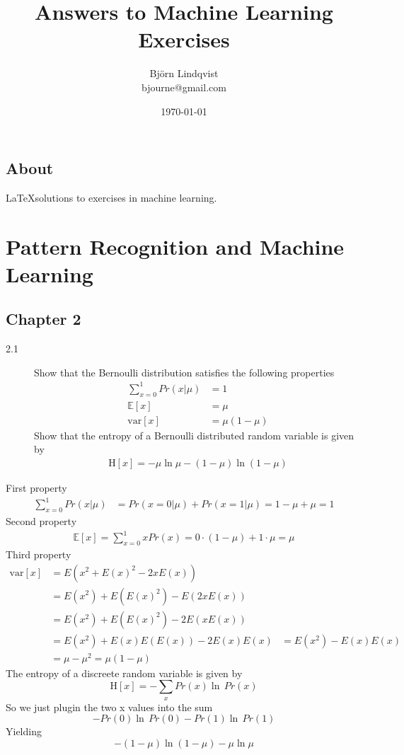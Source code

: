 \documentclass[10pt,a4paper]{article}
\title{Answers to Machine Learning Exercises}
\author{Björn Lindqvist\\bjourne@gmail.com}
\date{\today}
\newenvironment{prob}[1]%
   {%
    \begin{description}\item[#1]}%
   {\end{description}}
\begin{document}
\begin{titlingpage}
  \maketitle
  \thispagestyle{empty}
  \section*{About}
  \LaTeX solutions to exercises in machine learning.
  \tableofcontents
\end{titlingpage}

\section{Pattern Recognition and Machine Learning}

\subsection{Chapter 2}
\begin{prob}{2.1}
  Show that the Bernoulli distribution satisfies the following
  properties
  \begin{align}
    \sum_{x = 0}^1Pr(x|\mu) &= 1\\
    \mathbb{E}[x] &= \mu\\
    \mathrm{var}[x] &= \mu(1 - \mu)
  \end{align}
  Show that the entropy of a Bernoulli distributed random variable is
  given by
  \begin{align}
    \mathrm{H}[x] = -\mu\ln\mu - (1 - \mu)\ln(1 - \mu)
  \end{align}
\end{prob}
First property
\begin{align}
  \sum_{x = 0}^1Pr(x|\mu) &= Pr(x = 0|\mu) + Pr(x = 1|\mu)
  = 1 - \mu + \mu = 1
\end{align}
Second property
\begin{align}
  \mathbb{E}[x] = \sum_{x = 0}^1xPr(x) = 0\cdot(1 - \mu) + 1\cdot\mu = \mu
\end{align}
Third property
\begin{align}
  \mathrm{var}[x] &= E(x^2 + E(x)^2 - 2xE(x))\\
  &= E(x^2) + E(E(x)^2) - E(2xE(x))\\
  &= E(x^2) + E(E(x)^2) - 2E(xE(x))\\
  &= E(x^2) + E(x)E(E(x)) - 2E(x)E(x)
  &= E(x^2) - E(x)E(x)\\
  &= \mu - \mu^2 = \mu(1 - \mu)
\end{align}
The entropy of a discreete random variable is given by
\begin{equation}
  \mathrm{H}[x] = -\sum_xPr(x)\ln\,Pr(x)
\end{equation}
So we just plugin the two x values into the sum
\begin{equation}
  -Pr(0)\ln\,Pr(0) - Pr(1)\ln\,Pr(1)
\end{equation}
Yielding
\begin{equation}
  -(1 - \mu)\ln(1 - \mu) - \mu\ln\mu
\end{equation}
\end{document}

